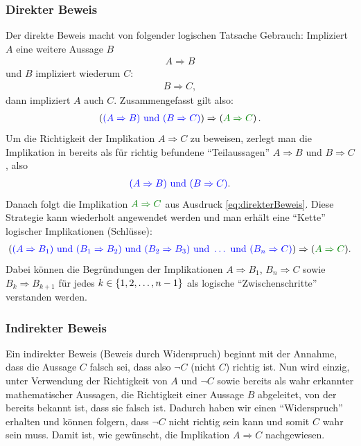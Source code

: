 \subsubsection{Direkter Beweis}
Der direkte Beweis macht von folgender logischen Tatsache Gebrauch: Impliziert $A$ eine weitere Aussage $B$
\begin{align*}
	A \Rightarrow B
\end{align*}
und $B$ impliziert wiederum $C$:
\begin{align*}
	B \Rightarrow C,
\end{align*}
dann impliziert $A$ auch $C$. Zusammengefasst gilt also:
\begin{align}\label{eq:direkterBeweis}
	\lr{\textcolor{Blue}{(A\Rightarrow B) \text{ und } (B\Rightarrow C)}} \Rightarrow \lr{\textcolor{Green}{A\Rightarrow C}}.
\end{align}
Um die Richtigkeit der Implikation $A\Rightarrow C$ zu beweisen, zerlegt man die Implikation in bereits als für richtig befundene \enquote{Teilaussagen} $A\Rightarrow B$ und $B\Rightarrow C$, also
\begin{align*}
	\textcolor{Blue}{(A\Rightarrow B) \text{ und } (B\Rightarrow C)}.
\end{align*}
Danach folgt die Implikation $\textcolor{Green}{A\Rightarrow C}$ aus Ausdruck \ref{eq:direkterBeweis}. Diese Strategie kann wiederholt angewendet werden und man erhält eine \enquote{Kette} logischer Implikationen (Schlüsse):
\begin{align*}
	\lr{ \textcolor{Blue}{(A\Rightarrow B_1) \text{ und } (B_1\Rightarrow B_2) \text{ und } (B_2\Rightarrow B_3) \text{ und } \ldots \text{ und } (B_n\Rightarrow C)} } \Rightarrow (\textcolor{Green}{A\Rightarrow C}).
\end{align*}
Dabei können die Begründungen der Implikationen $A\Rightarrow B_1$, $B_n\Rightarrow C$ sowie $B_k\Rightarrow B_{k+1}$ für jedes $k\in\left\{1,2,\ldots, n-1\right\}$ als logische \enquote{Zwischenschritte} verstanden werden.

\subsubsection{Indirekter Beweis}
Ein indirekter Beweis (Beweis durch Widerspruch) beginnt mit der Annahme, dass die Aussage $C$ falsch sei, dass also $\neg{C}$ (nicht $C$) richtig ist.
Nun wird einzig, unter Verwendung der Richtigkeit von $A$ und $\neg{C}$ sowie bereits als wahr erkannter mathematischer Aussagen, die Richtigkeit einer Aussage $B$ abgeleitet, von der bereits bekannt ist, dass sie falsch ist.
Dadurch haben wir einen \enquote{Widerspruch} erhalten und können folgern, dass $\neg{C}$ nicht richtig sein kann und somit $C$ wahr sein muss. Damit ist, wie gewünscht, die Implikation $A\Rightarrow C$ nachgewiesen.

